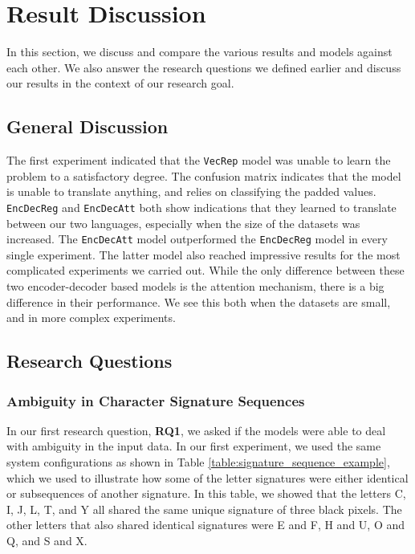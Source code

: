 
\section{Result Discussion}
\label{sec:result_discussion}
In this section, we discuss and compare the various results and models against each other. We also answer the research questions we defined earlier and discuss our results in the context of our research goal.

\subsection{General Discussion}
The first experiment indicated that the {\tt VecRep} model was unable to learn the problem to a satisfactory degree. The confusion matrix indicates that the model is unable to translate anything, and relies on classifying the padded values. {\tt EncDecReg} and {\tt EncDecAtt} both show indications that they learned to translate between our two languages, especially when the size of the datasets was increased. The {\tt EncDecAtt} model outperformed the {\tt EncDecReg} model in every single experiment. The latter model also reached impressive results for the most complicated experiments we carried out. While the only difference between these two encoder-decoder based models is the attention mechanism, there is a big difference in their performance. We see this both when the datasets are small, and in more complex experiments.

\subsection{Research Questions}

\subsubsection{Ambiguity in Character Signature Sequences}
In our first research question, \textbf{RQ1}, we asked if the models were able to deal with ambiguity in the input data. In our first experiment, we used the same system configurations as shown in Table \ref{table:signature_sequence_example}, which we used to illustrate how some of the letter signatures were either identical or subsequences of another signature. In this table, we showed that the letters C, I, J, L, T, and Y all shared the same unique signature of three black pixels. The other letters that also shared identical signatures were E and F, H and U, O and Q, and S and X. 

